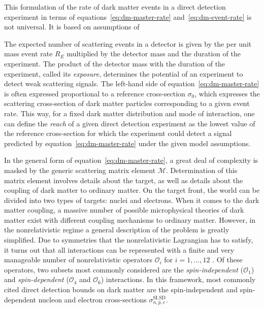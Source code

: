 \documentclass[b5paper, 10pt, twoside]{book}
\begin{document}
This formulation of the rate of dark matter events in a direct detection experiment in terms of equations~\eqref{eq:dm-master-rate} and~\eqref{eq:dm-event-rate} is not universal. It is based on assumptions of 

The expected number of scattering events in a detector is given by the per unit mass event rate $R_E$ multiplied by the detector mass and the duration of the experiment. The product of the detector mass with the duration of the experiment, called its \emph{exposure}, determines the potential of an experiment to detect weak scattering signals. The left-hand side of equation~\eqref{eq:dm-master-rate} is often expressed proportional to a reference cross-section $\sigma_0$, which expresses the scattering cross-section of dark matter particles corresponding to a given event rate. This way, for a fixed dark matter distribution and mode of interaction, one can define the \emph{reach} of a given direct detection experiment as the lowest value of the reference cross-section for which the experiment could detect a signal predicted by equation~\eqref{eq:dm-master-rate} under the given model assumptions.

In the general form of equation~\eqref{eq:dm-master-rate}, a great deal of complexity is masked by the generic scattering matrix element $\mathcal{M}$. Determination of this matrix element involves details about the target, as well as details about the coupling of dark matter to ordinary matter. On the target front, the world can be divided into two types of targets: nuclei and electrons. When it comes to the dark matter coupling, a massive number of possible microphysical theories of dark matter exist with different coupling mechanisms to ordinary matter. However, in the nonrelativistic regime a general description of the problem is greatly simplified. Due to symmetries that the nonrelativistic Lagrangian has to satisfy, it turns out that all interactions can be represented with a finite and very manageable number of nonrelativistic operators $\mathcal{O}_i$ for $i=1,\ldots,12$ \parencite{FitzpatrickEtAl2013}. Of these operators, two subsets most commonly considered are the \emph{spin-independent} ($\mathcal{O_1}$) and \emph{spin-dependent} ($\mathcal{O}_4$ and $\mathcal{O}_6$) interactions. In this framework, most commonly cited direct detection bounds on dark matter are the spin-independent and spin-dependent nucleon and electron cross-sections $\sigma_{n,p,e}^{\text{SI},\text{SD}}$.
\end{document}
